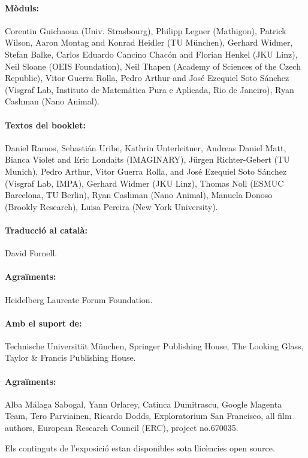 \paragraph{Mòduls:}
Corentin Guichaoua (Univ. Strasbourg), Philipp Legner (Mathigon), Patrick Wilson, Aaron Montag and Konrad Heidler (TU
 München), Gerhard Widmer, Stefan Balke, Carlos Eduardo Cancino Chacón and Florian Henkel (JKU Linz), Neil Sloane (OEIS Foundation), Neil Thapen (Academy of Sciences of the Czech Republic), Vitor Guerra Rolla, Pedro Arthur and José Ezequiel Soto Sánchez (Visgraf Lab, Instituto de Matemática Pura e Aplicada, Rio de Janeiro), Ryan Cashman (Nano Animal).

\paragraph{Textos del booklet:}
Daniel Ramos, Sebastián Uribe, Kathrin Unterleitner, Andreas Daniel Matt, Bianca Violet and Eric Londaits (IMAGINARY), Jürgen Richter-Gebert (TU Munich), Pedro Arthur, Vitor Guerra Rolla, and José Ezequiel Soto Sánchez (Visgraf Lab, IMPA), Gerhard Widmer (JKU Linz), Thomas Noll (ESMUC Bar\-ce\-lo\-na, TU Berlin), Ryan Cashman (Nano Animal), Manuela Donoso (Brookly Research), Luisa Pereira (New York University).

\paragraph{Traducció al català:} David Fornell.

\paragraph{Agraïments:}
Heidelberg Laureate Forum Foundation.

\paragraph{Amb el suport de:}
Technische Universität München, Springer Publishing House, The Looking Glass, Taylor \& Francis Publishing House.

\paragraph{Agraïments:}
Alba Málaga Sabogal, Yann Orlarey, Catinca Dumitrascu, Google Magenta Team, Tero Parviainen, Ricardo Dodds, Exploratorium San Francisco, all film authors, European Research Council (ERC), project no.670035.

Els continguts de l'exposició estan disponibles sota llicències open source.
\normalsize
